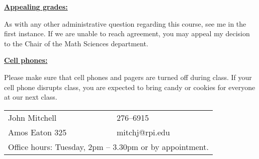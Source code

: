 \documentclass[11pt]{article}
\begin{document}
{\raggedright   {\bf \underline{Appealing grades:}} }
As with any other administrative question regarding this course,
see me in the first instance.  If we are unable to reach agreement,
you may appeal my decision to the Chair of the Math Sciences department. \\


{\raggedright  {\bf\underline {Cell phones:}}}
Please make sure that cell phones and pagers are turned off during class. If your cell phone
disrupts class, you are expected to bring candy or cookies for everyone at our next class.

\vspace{\fill}


\begin{tabular}{@{\hspace{2in}}ll}
   John Mitchell    &  276--6915 \\
   Amos Eaton 325   &  mitchj@rpi.edu  \\
   \multicolumn{2}{l}{{\hspace{1.92in}}Office hours:
Tuesday, 2pm -- 3.30pm or by appointment.}
\end{tabular}
\end{document}
